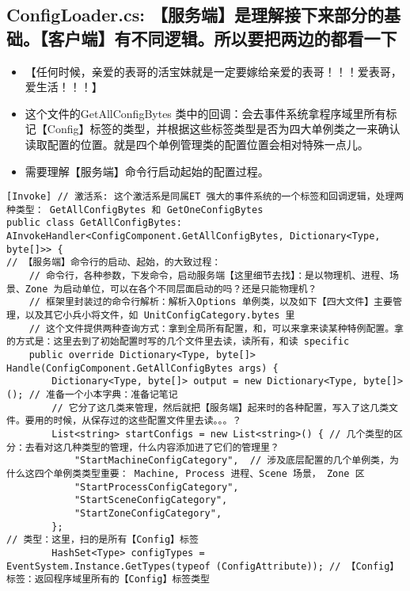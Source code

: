 \documentclass[9pt, b5paper]{article}
\begin{document}
\subsection{ConfigLoader.cs: 【服务端】是理解接下来部分的基础。【客户端】有不同逻辑。所以要把两边的都看一下}
\label{sec-6-3}
\begin{itemize}
\item 【任何时候，亲爱的表哥的活宝妹就是一定要嫁给亲爱的表哥！！！爱表哥，爱生活！！！】
\item 这个文件的GetAllConfigBytes 类中的回调：会去事件系统拿程序域里所有标记【Config】标签的类型，并根据这些标签类型是否为四大单例类之一来确认读取配置的位置。就是四个单例管理类的配置位置会相对特殊一点儿。
\item 需要理解【服务端】命令行启动起始的配置过程。
\end{itemize}
\begin{verbatim}
[Invoke] // 激活系: 这个激活系是同属ET 强大的事件系统的一个标签和回调逻辑，处理两种类型： GetAllConfigBytes 和 GetOneConfigBytes
public class GetAllConfigBytes: AInvokeHandler<ConfigComponent.GetAllConfigBytes, Dictionary<Type, byte[]>> {
// 【服务端】命令行的启动、起始，的大致过程：
    // 命令行，各种参数，下发命令，启动服务端【这里细节去找】：是以物理机、进程、场景、Zone 为启动单位，可以在各个不同层面启动的吗？还是只能物理机？
    // 框架里封装过的命令行解析：解析入Options 单例类，以及如下【四大文件】主要管理，以及其它小兵小将文件，如 UnitConfigCategory.bytes 里
    // 这个文件提供两种查询方式：拿到全局所有配置，和，可以来拿来读某种特例配置。拿的方式是：这里去到了初始配置时写的几个文件里去读，读所有，和读 specific
    public override Dictionary<Type, byte[]> Handle(ConfigComponent.GetAllConfigBytes args) {
        Dictionary<Type, byte[]> output = new Dictionary<Type, byte[]>(); // 准备一个小本字典：准备记笔记
        // 它分了这几类来管理，然后就把【服务端】起来时的各种配置，写入了这几类文件。要用的时候，从保存过的这些配置文件里去读。。。？
        List<string> startConfigs = new List<string>() { // 几个类型的区分：去看对这几种类型的管理，什么内容添加进了它们的管理里？
            "StartMachineConfigCategory",  // 涉及底层配置的几个单例类，为什么这四个单例类类型重要： Machine, Process 进程、Scene 场景， Zone 区
            "StartProcessConfigCategory", 
            "StartSceneConfigCategory", 
            "StartZoneConfigCategory",
        };
// 类型：这里，扫的是所有【Config】标签
        HashSet<Type> configTypes = EventSystem.Instance.GetTypes(typeof (ConfigAttribute)); // 【Config】标签：返回程序域里所有的【Config】标签类型

\end{verbatim}
\end{document}
